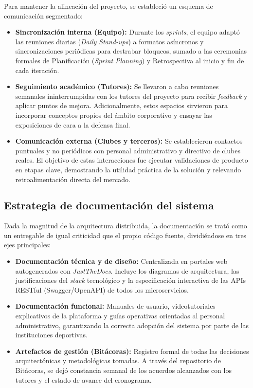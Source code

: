 Para mantener la alineación del proyecto, se estableció un esquema de comunicación segmentado:

\begin{itemize}
    \item \textbf{Sincronización interna (Equipo):} Durante los \textit{sprints}, el equipo adaptó las reuniones diarias (\textit{Daily Stand-ups}) a formatos asíncronos y sincronizaciones periódicas para destrabar bloqueos, sumado a las ceremonias formales de Planificación (\textit{Sprint Planning}) y Retrospectiva al inicio y fin de cada iteración.
    \item \textbf{Seguimiento académico (Tutores):} Se llevaron a cabo reuniones semanales ininterrumpidas con los tutores del proyecto para recibir \textit{feedback} y aplicar puntos de mejora. Adicionalmente, estos espacios sirvieron para incorporar conceptos propios del ámbito corporativo y ensayar las exposiciones de cara a la defensa final.
    \item \textbf{Comunicación externa (Clubes y terceros):} Se establecieron contactos puntuales y no periódicos con personal administrativo y directivo de clubes reales. El objetivo de estas interacciones fue ejecutar validaciones de producto en etapas clave, demostrando la utilidad práctica de la solución y relevando retroalimentación directa del mercado.
\end{itemize}

\subsection{Estrategia de documentación del sistema}

Dada la magnitud de la arquitectura distribuida, la documentación se trató como un entregable de igual criticidad que el propio código fuente, dividiéndose en tres ejes principales:

\begin{itemize}
    \item \textbf{Documentación técnica y de diseño:} Centralizada en portales web autogenerados con \textit{JustTheDocs}. Incluye los diagramas de arquitectura, las justificaciones del \textit{stack} tecnológico y la especificación interactiva de las APIs RESTful (Swagger/OpenAPI) de todos los microservicios.
    \item \textbf{Documentación funcional:} Manuales de usuario, videotutoriales explicativos de la plataforma y guías operativas orientadas al personal administrativo, garantizando la correcta adopción del sistema por parte de las instituciones deportivas.
    \item \textbf{Artefactos de gestión (Bitácoras):} Registro formal de todas las decisiones arquitectónicas y metodológicas tomadas. A través del repositorio de Bitácoras, se dejó constancia semanal de los acuerdos alcanzados con los tutores y el estado de avance del cronograma.
\end{itemize}
